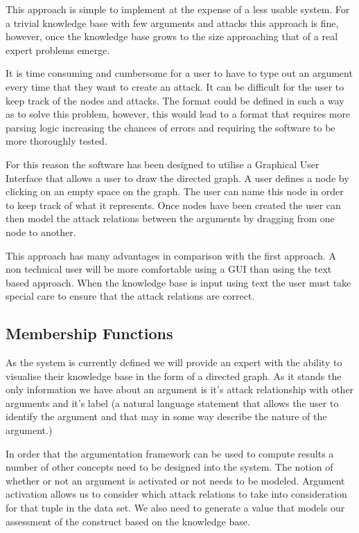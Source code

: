 This approach is simple to implement at the expense of a less usable system. For a trivial knowledge base with few arguments and attacks this approach is fine, however, once the knowledge base grows to the size approaching that of a real expert problems emerge.

It is time consuming and cumbersome for a user to have to type out an argument every time that they want to create an attack. It can be difficult for the user to keep track of the nodes and attacks. The format could be defined in such a way as to solve this problem, however, this would lead to a format that requires more parsing logic increasing the chances of errors and requiring the software to be more thoroughly tested.

For this reason the software has been designed to utilise a Graphical User Interface that allows a user to draw the directed graph. A user defines a node by clicking on an empty space on the graph. The user can name this node in order to keep track of what it represents. Once nodes have been created the user can then model the attack relations between the arguments by dragging from one node to another.

This approach has many advantages in comparison with the first approach. A non technical user will be more comfortable using a GUI than using the text based approach. When the knowledge base is input using text the user must take special care to ensure that the attack relations are correct.

\subsection{Membership Functions}

As the system is currently defined we will provide an expert with the ability to visualise their knowledge base in the form of a directed graph. As it stands the only information we have about an argument is it's attack relationship with other arguments and it's label (a natural language statement that allows the user to identify the argument and that may in some way describe the nature of the argument.) 

In order that the argumentation framework can be used to compute results a number of other concepts need to be designed into the system. The notion of whether or not an argument is activated or not needs to be modeled. Argument activation allows us to consider which attack relations to take into consideration for that tuple in the data set. We also need to generate a value that models our assessment of the construct based on the knowledge base.

